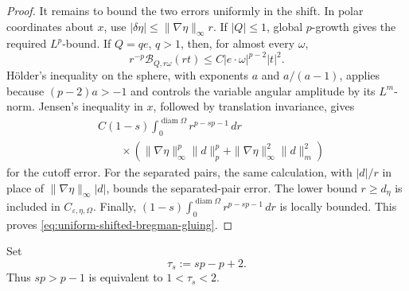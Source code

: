 \documentclass[11pt,reqno]{amsart}
\numberwithin{equation}{section}
\newcommand{\dd}{\,d}
\theoremstyle{remark}
\begin{document}
\begin{proof}
It remains to bound the two errors uniformly in the shift.  In polar
coordinates about \(x\), use
\(|\delta\eta|\le\|\nabla\eta\|_\infty r\).  If \(|Q|\le1\), global
\(p\)-growth gives the required \(L^p\)-bound.  If \(Q=qe\), \(q>1\),
then, for almost every \(\omega\),
\[
 r^{-p}\mathcal B_{Q,r\omega}(rt)
 \le C|e\cdot\omega|^{p-2}|t|^2.
\]
H\"older's inequality on the sphere, with exponents \(a\) and
\(a/(a-1)\), applies because \((p-2)a>-1\) and controls the variable
angular amplitude by its \(L^m\)-norm.  Jensen's inequality in \(x\),
followed by translation invariance, gives
\begin{align*}
 &C(1-s)\int_0^{\operatorname{diam}\Omega}r^{p-sp-1}\dd r\\
 &\qquad\times\left(
 \|\nabla\eta\|_\infty^p\|d\|_p^p
 +\|\nabla\eta\|_\infty^2\|d\|_m^2\right)
\end{align*}
for the cutoff error.  For the separated pairs, the same calculation, with
\(|d|/r\) in place of \(\|\nabla\eta\|_\infty|d|\), bounds the
separated-pair error.  The lower bound \(r\ge d_\eta\) is included
in \(C_{\varepsilon,\eta,\Omega}\).  Finally,
\((1-s)\int_0^{\operatorname{diam}\Omega}r^{p-sp-1}\dd r\) is locally
bounded.  This proves \eqref{eq:uniform-shifted-bregman-gluing}.
\end{proof}

Set
\begin{equation*}
 \tau_s:=sp-p+2.
\end{equation*}
Thus \(sp>p-1\) is equivalent to \(1<\tau_s<2\).
\end{document}
